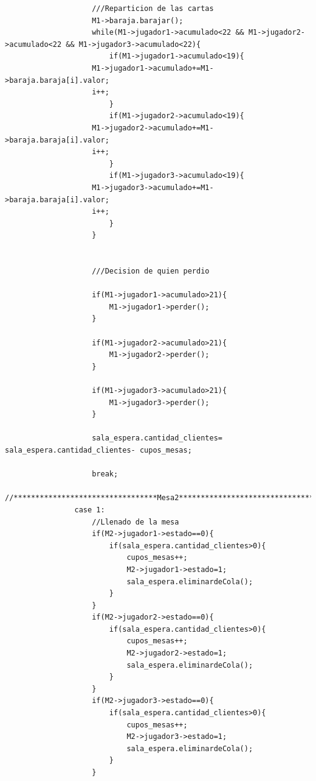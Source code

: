 \documentclass[11pt]{article}
\begin{document}
\begin{lstlisting}
                    ///Reparticion de las cartas
                    M1->baraja.barajar();
                    while(M1->jugador1->acumulado<22 && M1->jugador2->acumulado<22 && M1->jugador3->acumulado<22){
                        if(M1->jugador1->acumulado<19){
                    M1->jugador1->acumulado+=M1->baraja.baraja[i].valor;
                    i++;
                        }
                        if(M1->jugador2->acumulado<19){
                    M1->jugador2->acumulado+=M1->baraja.baraja[i].valor;
                    i++;
                        }
                        if(M1->jugador3->acumulado<19){
                    M1->jugador3->acumulado+=M1->baraja.baraja[i].valor;
                    i++;
                        }
                    }


                    ///Decision de quien perdio

                    if(M1->jugador1->acumulado>21){
                        M1->jugador1->perder();
                    }

                    if(M1->jugador2->acumulado>21){
                        M1->jugador2->perder();
                    }

                    if(M1->jugador3->acumulado>21){
                        M1->jugador3->perder();
                    }                

                    sala_espera.cantidad_clientes= sala_espera.cantidad_clientes- cupos_mesas; 

                    break;
                    //*********************************Mesa2************************************
                case 1:
                    //Llenado de la mesa
                    if(M2->jugador1->estado==0){
                        if(sala_espera.cantidad_clientes>0){
                            cupos_mesas++;
                            M2->jugador1->estado=1;
                            sala_espera.eliminardeCola();
                        }
                    }
                    if(M2->jugador2->estado==0){
                        if(sala_espera.cantidad_clientes>0){
                            cupos_mesas++;
                            M2->jugador2->estado=1;
                            sala_espera.eliminardeCola();
                        }
                    }
                    if(M2->jugador3->estado==0){
                        if(sala_espera.cantidad_clientes>0){
                            cupos_mesas++;
                            M2->jugador3->estado=1;
                            sala_espera.eliminardeCola();
                        }
                    }



\end{lstlisting}
\end{document}
